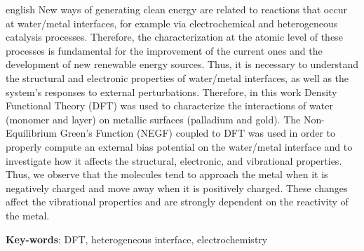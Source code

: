 \begin{resumo}[Abstract]
 \begin{otherlanguage*}{english}
New ways of generating clean energy are related to reactions that occur at water/metal interfaces, for example via electrochemical and heterogeneous catalysis processes. Therefore, the characterization at the atomic level of these processes is fundamental for the improvement of the current ones and the development of new renewable energy sources. Thus, it is necessary to understand the structural and electronic properties of water/metal interfaces, as well as the system's responses to external perturbations. Therefore, in this work Density Functional Theory (DFT) was used to characterize the interactions of water (monomer and layer) on metallic surfaces (palladium and gold). The Non-Equilibrium Green's Function (NEGF) coupled to DFT was used in order to properly compute an external bias potential on the water/metal interface and to investigate how it affects the structural, electronic, and vibrational properties. Thus, we observe that the molecules tend to approach the metal when it is negatively charged and move away when it is positively charged. These changes affect the vibrational properties and are strongly dependent on the reactivity of the metal.




   \vspace{\onelineskip}
 
   \noindent 
   \textbf{Key-words}: DFT, heterogeneous interface, electrochemistry
   

 \end{otherlanguage*}
\end{resumo}